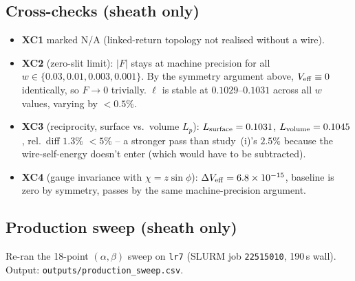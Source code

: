 \documentclass[11pt]{article}
\begin{document}
\subsection{Cross-checks (sheath only)}

\begin{itemize}
\item \textbf{XC1} marked N/A (linked-return topology not realised
without a wire).
\item \textbf{XC2} (zero-slit limit): $|F|$ stays at machine precision
for all $w\in\{0.03, 0.01, 0.003, 0.001\}$.  By the symmetry argument
above, $V_{\rm eff}\equiv 0$ identically, so $F\to 0$ trivially.
$\ell$ is stable at $0.1029$--$0.1031$ across all $w$ values, varying
by $<0.5\%$.
\item \textbf{XC3} (reciprocity, surface vs.\ volume $L_p$):
$L_{\rm surface}=0.1031$, $L_{\rm volume}=0.1045$, rel.\ diff $1.3\%$
$<5\%$ -- a stronger pass than study~(i)'s $2.5\%$ because the
wire-self-energy doesn't enter (which would have to be subtracted).
\item \textbf{XC4} (gauge invariance with $\chi=z\sin\phi$):
$\Delta V_{\rm eff}=6.8\times 10^{-15}$, baseline is zero by
symmetry, passes by the same machine-precision argument.
\end{itemize}

\subsection{Production sweep (sheath only)}

Re-ran the 18-point $(\alpha,\beta)$ sweep on \texttt{lr7}
(SLURM job \texttt{22515010}, 190\,s wall).  Output:
\texttt{outputs/production\_sweep.csv}.
\end{document}

